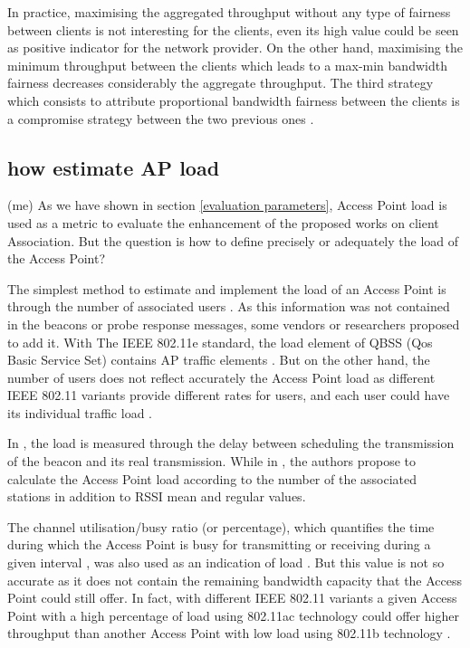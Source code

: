 \documentclass[journal,transmag]{IEEEtran}
\begin{document}
In practice, maximising the aggregated throughput without any type of fairness between clients is not interesting for the clients, even its high value could be seen as positive indicator for the network provider. On the other hand, maximising the minimum throughput between the clients which leads to a max-min bandwidth fairness decreases considerably the aggregate throughput. The third strategy which consists to attribute proportional bandwidth fairness between the clients is a compromise strategy between the two previous ones \cite{08AP_assignement_algorithms}.
    
\subsection{how estimate AP load} (me)
As we have shown in section \ref{evaluation parameters}, Access Point load is used as a metric to evaluate the enhancement of the proposed works on client Association. But the question is how to define precisely or adequately the load of the Access Point? 

The simplest method to estimate and implement the load of an Access Point is through the number of associated users \cite{11stability_fairness_APselection_game,14online_AP_association_80211n}. As this information was not contained in the beacons or probe response messages, some vendors or researchers proposed to add it. With The IEEE 802.11e standard, the load element of QBSS (Qos Basic Service Set) contains AP traffic elements \cite{09load_balancing_WLAN}. But on the other hand, the number of users does not reflect accurately the Access Point load as different IEEE 802.11 variants provide different rates for users, and each user could have its individual traffic load \cite{07optimal_association_MSWIM}.  

In \cite{05facilitating_AP_selection,14online_AP_association_80211n,09load_balancing_WLAN}, the load is measured through the delay between scheduling the transmission of the beacon and its real transmission. While in \cite{01dynamic_loadBalanceWLAN}, the authors propose to calculate the Access Point load according to the number of the associated stations in addition to RSSI mean and regular values.   

The channel utilisation/busy ratio (or percentage), which quantifies the time during which the Access Point is busy for transmitting or receiving during a given interval \cite{09load_balancing_WLAN}, was also used as an indication of load \cite{14online_AP_association_80211n}. But this value is not so accurate as it does not contain the remaining bandwidth capacity that the Access Point could still offer. In fact, with different IEEE 802.11 variants a given Access Point with a high percentage of load using 802.11ac technology could offer higher throughput than another Access Point with low load using 802.11b technology \cite{09load_balancing_WLAN}.  
\end{document}

